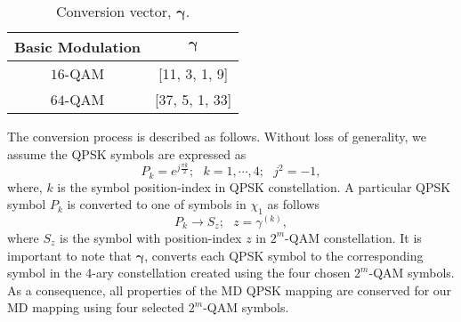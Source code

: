 \documentclass[12pt, draftclsnofoot, onecolumn]{IEEEtran}
\newcommand{\mb}[1]{\boldsymbol{#1}}
\begin{document}
 \begin{table}[h!]
\caption{Conversion vector, $\mb{\gamma}$.}
\centering
\begin{tabular}{|c||c|} 
\hline
Basic Modulation & $\mb{\gamma}$ \\ \hline \hline
$16$-QAM &  [11, 3, 1,  9]  \\ \hline
$64$-QAM & [37, 5, 1, 33]\\ \hline
\end{tabular}
\label{alpha_gamma}
\end{table}
 
 The conversion process is described as follows. Without loss of generality, we assume the QPSK symbols are expressed  as 
\begin{equation}
P_{k}= e^{j\frac{\pi k}{2}}; ~~~ k = 1, \cdots, 4; ~~~ j^{2} = -1,
\end{equation} 
where, $k$ is the symbol position-index in QPSK constellation.   A particular QPSK symbol $P_{k}$ is converted to one of symbols in $\chi_1$ as follows 
\begin{equation}
\label{convert}
P_{k}\rightarrow S_{z}; ~~~ z = \gamma^{(k)},
\end{equation}
where $S_{z}$ is the symbol with position-index $z$ in $2^{m}$-QAM constellation. %
 It is important to note that   $\mb{\gamma}$, converts each QPSK symbol  to the corresponding symbol in the 4-ary constellation created using  the four  chosen $2^{m}$-QAM symbols. As a consequence, all properties  \color{black}of the  MD QPSK mapping  \cite{MD-BQPSK-Simoen} are conserved for our MD mapping using  four  selected $2^m$-QAM symbols.
\end{document}

